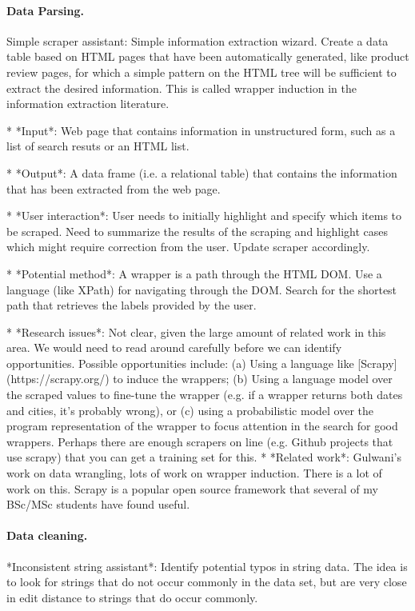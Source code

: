 \documentclass[sigplan,preprint,10pt]{acmart}\settopmatter{printfolios=true,printccs=false,printacmref=false}
\theoremstyle{plain}
\theoremstyle{definition}
\begin{document}
{\color{blue}

\paragraph{Data Parsing.}

Simple scraper assistant: Simple information extraction wizard. Create a data table based
on HTML pages that have been automatically generated, like product review pages,
for which a simple pattern on the HTML tree will be sufficient to extract the desired information.
This is called wrapper induction in the information extraction literature.

* *Input*: Web page that contains information in unstructured form, such as a list of search resuts or an HTML list.

* *Output*: A data frame (i.e. a relational table) that contains the information that has
been extracted from the web page.

* *User interaction*: User needs to initially highlight and specify which items to be scraped.
Need to summarize the results of the scraping and highlight cases
which might require correction from the user. Update scraper accordingly.

* *Potential method*: A wrapper is a path through the HTML DOM. Use a language (like XPath) for navigating through the DOM. Search for the shortest path that retrieves
the labels provided by the user.

* *Research issues*: Not clear, given the large amount of related work in this area.
We would need to read around carefully before we can identify opportunities.
Possible opportunities include:
    (a) Using a language like [Scrapy](https://scrapy.org/) to induce the wrappers;
    (b) Using a language model over the scraped values to fine-tune the wrapper (e.g. if a wrapper returns both dates and cities, it's probably wrong), or
	(c) using a probabilistic model over the program representation of the wrapper to focus attention in the search
for good wrappers. Perhaps there are enough scrapers on line (e.g. Github projects that use scrapy) that you can get a training set for this.
* *Related work*: Gulwani's work on data wrangling, lots of work on wrapper induction.
There is a lot of work on this. Scrapy is a popular open source framework that several
of my BSc/MSc students have found useful.

\paragraph{Data cleaning.}
*Inconsistent string assistant*: Identify potential typos in string data. The idea is to look for strings that do not occur commonly in the data set, but are very close in edit distance
to strings that do occur commonly.

}
\end{document}
